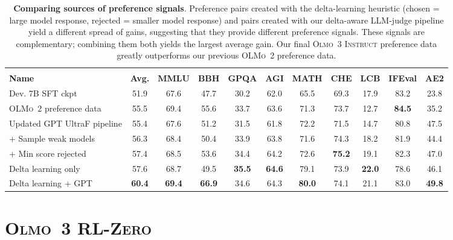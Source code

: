 \documentclass[table]{ai2style/ai2}
\newcommand{\oldOlmo}{OLMo\xspace}
\newcommand{\newOlmo}{Olmo\xspace}
\newcommand{\olmotoo}{\textsc{\oldOlmo~2}\xspace}
\newcommand{\olmothreeinstruct}{\textsc{\newOlmo~3 Instruct}\xspace}
\newcommand{\olmothreerlzero}{\textsc{\newOlmo~3 RL-Zero}\xspace}
\begin{document}
{{\begin{table}[t]
\centering
\small
\begin{tabular}{@{}l >{\columncolor{ai2pink!18}}c ccccccccc@{}}
\toprule
& \multicolumn{10}{c}{\textbf{Subset of \olmothreeinstruct Benchmarks}} \\
\cmidrule(lr){2-11}
\textbf{Name} & \cellcolor{ai2pink!18}\textbf{Avg.} & \textbf{MMLU} & \textbf{BBH} & \textbf{GPQA} & \textbf{AGI} & \textbf{MATH} & \textbf{CHE} & \textbf{LCB} & \textbf{IFEval} & \textbf{AE2} \\
\midrule
Dev. 7B SFT ckpt & 51.9 & 67.6 & 47.7 & 30.2 & 62.0 & 65.5 & 69.3 & 17.9 & 83.2 & 23.8 \\
\olmotoo preference data & 55.5 & 69.4 & 55.6 & 33.7 & 63.6 & 71.3 & 73.7 & 12.7 & {\bf 84.5} & 35.2 \\
\midrule
Updated GPT UltraF pipeline & 55.4 & 67.6 & 51.2 & 31.5 & 61.8 & 72.2 & 71.5 & 14.7 & 80.8 & 47.5 \\
+ Sample weak models & 56.3 & 68.4 & 50.4 & 33.9 & 63.8 & 71.6 & 74.3 & 18.2 & 81.9 & 44.4 \\
+ Min score rejected & 57.4 & 68.5 & 53.6 & 34.4 & 64.2 & 72.6 & {\bf 75.2} & 19.1 & 82.3 & 47.0 \\
Delta learning only & 57.6 & 68.7 & 49.5 & {\bf 35.5} & {\bf 64.6} & 79.1 & 73.9 & {\bf 22.0} & 78.6 & 46.1 \\
\midrule
Delta learning + GPT & {\bf 60.4} & {\bf 69.4} & {\bf 66.9} & 34.6 & 64.3 & {\bf 80.0} & 74.1 & 21.1 & 83.0 & {\bf 49.8} \\
\bottomrule
\end{tabular}
\caption{\textbf{Comparing sources of preference signals}. Preference pairs created with the delta-learning heuristic (chosen = large model response, rejected = smaller model response) and pairs created with our delta-aware LLM-judge pipeline yield a different spread of gains, suggesting that they provide different preference signals. These signals are complementary; combining them both yields the largest average gain. Our final \olmothreeinstruct preference data greatly outperforms our previous \olmotoo preference data.}
\label{tab:dpo_different_signals}
\end{table}

\newpage
\section{\olmothreerlzero}
\label{sec:rlzero}

}}
\end{document}
